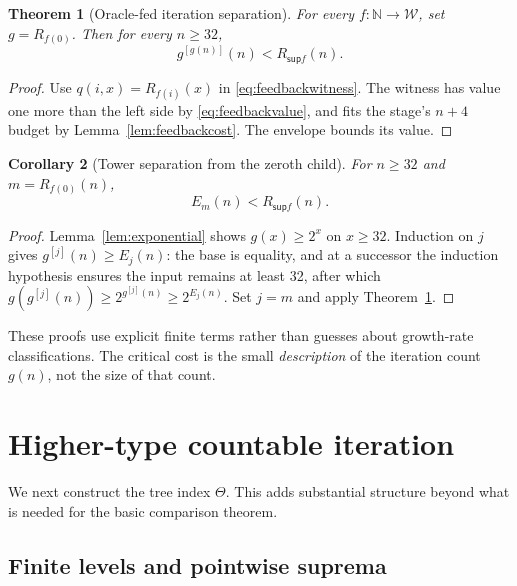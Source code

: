 \documentclass[11pt]{article}
\newtheorem{theorem}{Theorem}[section]
\newtheorem{corollary}[theorem]{Corollary}
\theoremstyle{definition}
\newcommand{\N}{\mathbb N}
\newcommand{\W}{\mathcal W}
\newcommand{\Sup}{\mathsf{sup}}
\begin{document}
\begin{theorem}[Oracle-fed iteration separation]\label{thm:feedback}
For every $f:\N\to\W$, set $g=R_{f(0)}$. Then for every $n\ge32$,
\begin{equation}\label{eq:feedbackseparation}
 g^{[g(n)]}(n)<R_{\Sup f}(n).
\end{equation}
\end{theorem}
\begin{proof}
Use $q(i,x)=R_{f(i)}(x)$ in \eqref{eq:feedbackwitness}. The witness has
value one more than the left side by \eqref{eq:feedbackvalue}, and fits the
stage's $n+4$ budget by Lemma~\ref{lem:feedbackcost}. The envelope bounds
its value.
\end{proof}

\begin{corollary}[Tower separation from the zeroth child]\label{cor:tower}
For $n\ge32$ and $m=R_{f(0)}(n)$,
\[
 E_m(n)<R_{\Sup f}(n).
\]
\end{corollary}
\begin{proof}
Lemma~\ref{lem:exponential} shows $g(x)\ge2^x$ on $x\ge32$. Induction on
$j$ gives $g^{[j]}(n)\ge E_j(n)$: the base is equality, and at a successor
the induction hypothesis ensures the input remains at least 32, after which
$g(g^{[j]}(n))\ge2^{g^{[j]}(n)}\ge2^{E_j(n)}$. Set $j=m$ and apply
Theorem~\ref{thm:feedback}.
\end{proof}

These proofs use explicit finite terms rather than guesses about growth-rate
classifications. The critical cost is the small \emph{description} of the
iteration count $g(n)$, not the size of that count.

\section{Higher-type countable iteration}
\label{sec:higher}

We next construct the tree index $\Theta$. This adds substantial structure
beyond what is needed for the basic comparison theorem.

\subsection{Finite levels and pointwise suprema}
\end{document}
